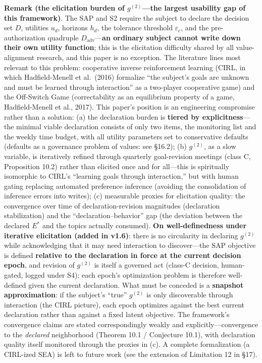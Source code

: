 \documentclass[
  11pt]{article}
\begin{document}
\textbf{Remark (the elicitation burden of \(g^{(2)}\)---the largest
usability gap of this framework)}. The SAP and S2 require the subject to
declare the decision set \(D\), utilities \(u_d\), horizons \(h_d\), the
tolerance threshold \(\varepsilon_c\), and the pre-authorization
quadruple \(D_{\mathrm{adv}}\)---\textbf{an ordinary subject cannot
write down their own utility function}; this is the elicitation
difficulty shared by all value-alignment research, and this paper is no
exception. The literature lines most relevant to this problem:
cooperative inverse reinforcement learning (CIRL, in which
Hadfield-Menell et al.~(2016) formalize ``the subject's goals are
unknown and must be learned through interaction'' as a two-player
cooperative game) and the Off-Switch Game (correctability as an
equilibrium property of a game, Hadfield-Menell et al., 2017). This
paper's position is an engineering compromise rather than a solution:
(a) the declaration burden is \textbf{tiered by explicitness}---the
minimal viable declaration consists of only two items, the monitoring
list and the weekly time budget, with all utility parameters set to
conservative defaults (defaults as a governance problem of values: see
§16.2); (b) \(g^{(2)}\), as a slow variable, is iteratively refined
through quarterly goal-revision meetings (class C, Proposition 10.2)
rather than elicited once and for all---this is spiritually isomorphic
to CIRL's ``learning goals through interaction,'' but with human gating
replacing automated preference inference (avoiding the consolidation of
inference errors into writes); (c) measurable proxies for elicitation
quality: the convergence over time of declaration-revision magnitudes
(declaration stabilization) and the ``declaration--behavior'' gap (the
deviation between the declared \(E^*\) and the topics actually
consumed). \textbf{On well-definedness under iterative elicitation
(added in v1.6)}: there is no circularity in declaring \(g^{(2)}\) while
acknowledging that it may need interaction to discover---the SAP
objective is defined \textbf{relative to the declaration in force at the
current decision epoch}, and revision of \(g^{(2)}\) is itself a
governed act (class-C decision, human-gated, logged under S4); each
epoch's optimization problem is therefore well-defined given the current
declaration. What must be conceded is a \textbf{snapshot approximation}:
if the subject's ``true'' \(g^{(2)}\) is only discoverable through
interaction (the CIRL picture), each epoch optimizes against the best
current declaration rather than against a fixed latent objective. The
framework's convergence claims are stated correspondingly weakly and
explicitly---convergence to the \emph{declared} neighborhood (Theorem
10.1 / Conjecture 10.1), with declaration quality itself monitored
through the proxies in (c). A complete formalization (a CIRL-ized SEA)
is left to future work (see the extension of Limitation 12 in §17).
\end{document}

